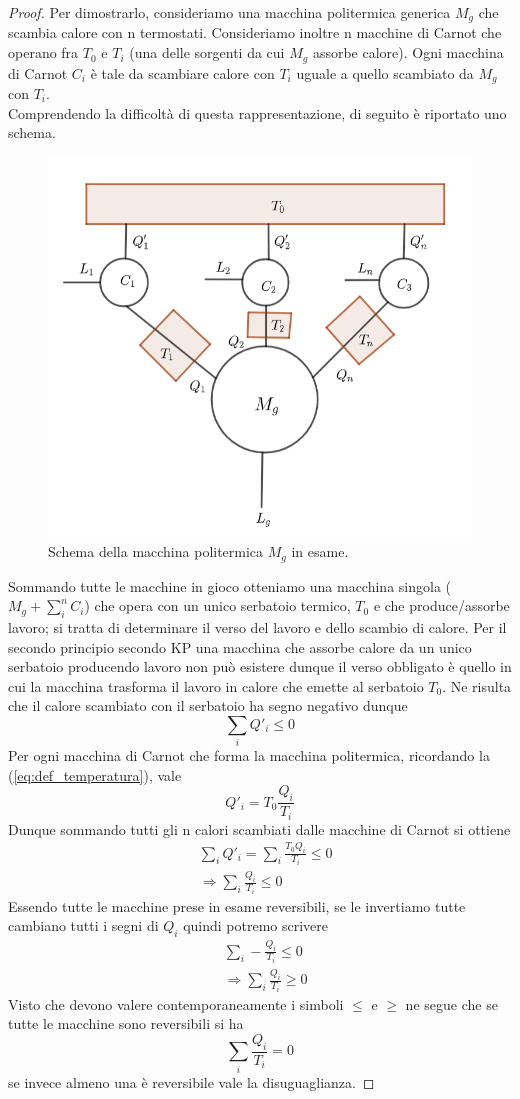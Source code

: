 \documentclass[
10pt, %
a4paper, %
oneside, %
headinclude,footinclude, %
BCOR5mm, %
]{scrartcl}
\begin{document}
\begin{proof}
	Per dimostrarlo, consideriamo una macchina politermica generica \(M_g\) che scambia calore con n termostati. Consideriamo inoltre n macchine di Carnot che operano fra \(T_0 \) e \(T_i\) (una delle sorgenti da cui \(M_g\) assorbe calore). Ogni macchina di Carnot \(C_i\) è tale da scambiare calore con \(T_i\) uguale a quello scambiato da \(M_g\) con \(T_i\).\\
	Comprendendo la difficoltà di questa rappresentazione, di seguito è riportato uno schema.
	\begin{figure}[h!]
		\centering
		\includegraphics[width=0.6\linewidth]{../images/macchina_polit}
		\caption{Schema della macchina politermica \(M_g\) in esame.}
		\label{fig:macchinapolit}
	\end{figure}
	\FloatBarrier
	Sommando  tutte le macchine in gioco otteniamo una macchina singola (\(M_g+\sum_i^n C_i\)) che opera con un unico serbatoio termico, \(T_0\) e che produce/assorbe lavoro; si tratta di determinare il verso del lavoro e dello scambio di calore. Per il secondo principio secondo KP una macchina che assorbe calore da un unico serbatoio producendo lavoro non può esistere dunque il verso obbligato è quello in cui la macchina trasforma il lavoro in calore che emette al serbatoio \(T_0\). Ne risulta che il calore scambiato con il serbatoio ha segno negativo dunque 
	\[\sum_i Q'_i \leq 0\]
	Per ogni macchina di Carnot che forma la macchina politermica, ricordando la (\ref{eq:def_temperatura}), vale 
	\[Q'_i = T_0 \frac{Q_i}{T_i}\]
	Dunque sommando tutti gli n calori scambiati dalle macchine di Carnot si ottiene
	\begin{align*}
		&\sum_i Q'_i = \sum_i\frac{T_0 Q_i}{T_i}\leq 0\\
		&\Rightarrow \sum_i \frac{Q_i}{T_i}\leq 0
	\end{align*}
	Essendo tutte le macchine prese in esame reversibili, se le invertiamo tutte cambiano tutti i segni di \(Q_i\) quindi potremo scrivere
	\begin{align*}
		&\sum_i -\frac{Q_i}{T_i}\leq 0\\
		&\Rightarrow \sum_i \frac{Q_i}{T_i}\geq 0
	\end{align*}
	Visto che devono valere contemporaneamente i simboli $\leq$ e $\geq$ ne segue che se tutte le macchine sono reversibili si ha 
	\[\sum_i \frac{Q_i}{T_i} = 0\]
	se invece almeno una è reversibile vale la disuguaglianza.
\end{proof}
\end{document}
